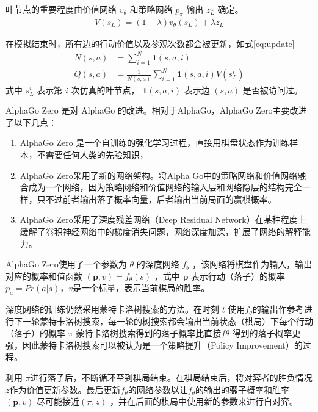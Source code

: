 叶节点的重要程度由价值网络 $v_\theta$ 和策略网络 $p_\pi$ 输出 $z_L$ 确定。
\begin{equation}
\label{eq:MCTS_leaf}
\begin{aligned}
V(s_L) = (1-\lambda)v_{\theta}(s_L) + \lambda z_L
\end{aligned}
\end{equation}

在模拟结束时，所有边的行动价值以及参观次数都会被更新，如式\ref{eq:update}
\begin{equation}
\label{eq:update}
\begin{aligned}
N(s,a) &= \sum_{i=1}^{N} \mathbf{1}(s,a,i) \\
Q(s,a) &= \frac{1}{N(s,a)} \sum_{i=1}^{N} \mathbf{1}(s,a,i) V(s_L^i)
\end{aligned}
\end{equation}
式中 $s_L^i$ 表示第 $i$ 次仿真的叶节点， $\mathbf{1}(s,a,i)$ 表示边 $(s,a)$ 是否被访问过。

AlphaGo Zero 是对 AlphaGo 的改进。相对于AlphaGo，AlphaGo Zero主要改进了以下几点：

\begin{enumerate}
	\item AlphaGo Zero 是一个自训练的强化学习过程，直接用棋盘状态作为训练样本，不需要任何人类的先验知识，
	\item AlphaGo Zero采用了新的网络架构。将Alpha Go中的策略网络和价值网络融合成为一个网络，因为策略网络和价值网络的输入层和网络隐层的结构完全一样，只不过前者输出落子概率向量，后者输出当前局面的赢棋概率。
	\item AlphaGo Zero采用了深度残差网络（Deep Residual Network）在某种程度上缓解了卷积神经网络中的梯度消失问题，网络深度加深，扩展了网络的解释能力。

\end{enumerate}

AlphaGo Zero使用了一个参数为 $\theta$ 的深度网络 $f_{\theta}$ ，该网络将棋盘作为输入，输出对应的概率和值函数 $(\mathbf{p}, v) = f_{\theta}(s)$ ，式中 $\mathbf{p}$ 表示行动（落子）的概率 $p_a = Pr(a|s)$，$v$是一个标量，表示当前棋局的胜率。


深度网络的训练仍然采用蒙特卡洛树搜索的方法。在时刻 $t$ 使用$f_{\theta}$的输出作参考进行下一轮蒙特卡洛树搜索，每一轮的树搜索都会输出当前状态（棋局）下每个行动（落子）的概率 $\pi$ 蒙特卡洛树搜索得到的落子概率比直接$f\theta$ 得到的落子概率更强，因此蒙特卡洛树搜索可以被认为是一个策略提升（Policy Improvement）的过程。

利用 $\pi$进行落子后，不断循环至到棋局结束。在棋局结束后，将对弈者的胜负情况$z$作为价值更新参数。最后更新$f_\theta$的网络参数以让$f_\theta$的输出的骡子概率和胜率 $(\mathbf{p},v)$ 尽可能接近$(\pi,z)$ ，并在后面的棋局中使用新的参数来进行自对弈。

